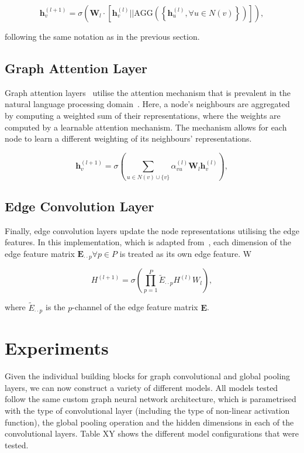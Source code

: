 \documentclass[10pt,conference,compsocconf]{IEEEtran}
\begin{document}
\begin{equation}
  \mathbf{h}_v^{(l+1)} = \sigma\left( \mathbf{W}_l \cdot
  \left[\mathbf{h}_v^{(l)} || \mathrm{AGG} \left(\left\{\mathbf{h}_u^{(l)}, \forall u\in N(v) \right\}\right) \right] \right),
\end{equation}

following the same notation as in the previous section.

\subsection{Graph Attention Layer}

Graph attention layers~\cite{graphatt} utilise the attention mechanism that is prevalent in the
natural language processing domain~\cite{attention}. Here, a node's neighbours 
are aggregated by computing a weighted sum of their representations, where the
weights are computed by a learnable attention mechanism. The mechanism allows
for each node to learn a different weighting of its neighbours' representations.

\begin{equation}
  \mathbf{h}_v^{(l+1)} = \sigma\left( \sum_{u\in N(v) \cup \{v\}}
  \alpha_{vu}^{(l)} \mathbf{W}_l\mathbf{h}_v^{(l)} \right),
\end{equation}

\subsection{Edge Convolution Layer}

Finally, edge convolution layers update the node representations utilising the
edge features. In this implementation, which is adapted from~\cite{edgeconv},
each dimension of the edge feature matrix $\mathbf{E}_{\cdot\cdot p} \forall
p \in P$ is treated as its own edge feature. W 

\begin{equation}
  H^{(l+1)} = 
  \sigma\left(\prod_{p=1}^P \tilde{E}_{\cdot\cdot p} H^{(l)} W_l \right),
\end{equation}

where $\tilde{E}_{\cdot\cdot p}$ is the $p$-channel of the edge feature 
matrix $\mathbf{E}$.

\section{Experiments}

Given the individual building blocks for graph convolutional and global pooling 
layers, we can now construct a variety of different models. All models tested
follow the same custom graph neural network architecture, which is parametrised
with the type of convolutional layer (including the type of non-linear
activation function), the global pooling operation and the hidden
dimensions in each of the convolutional layers. Table XY shows the different
model configurations that were tested.
\end{document}
